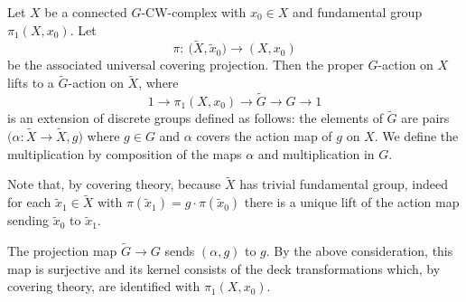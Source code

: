 \documentclass[pdftex]{sigma}
\numberwithin{equation}{section}
\begin{document}
Let $X$ be a connected $G$-CW-complex with $x_0\in X$ and fundamental group
	$\pi_1(X,x_0)$. Let
	\begin{equation*}
		\pi\colon\ \bigl(\tilde{X},\tilde x_0\bigr)\to (X,x_0)
	\end{equation*}
	be the
	associated universal covering projection. Then the
	proper $G$-action on $X$ lifts to a $\widetilde{G}$-action on $\tilde{X}$,
	where
	\begin{equation*}
		1\to\pi_1(X,x_0)\to \widetilde{G}\to G\to 1
	\end{equation*}
	is an extension of
	discrete groups
	defined as follows: the elements of $\widetilde{G}$ are pairs
	$\bigl(\alpha\colon\tilde X\to\tilde X,g\bigr)$ where $g\in G$ and $\alpha$ covers the
	action map of $g$ on $X$. We define the multiplication by composition of the
	maps $\alpha$ and
	multiplication in $G$.
	
	Note that, by covering theory, because $\tilde X$
	has trivial fundamental group, indeed for each $\tilde x_1\in\tilde X$ with
	$\pi(\tilde x_1)=g\cdot \pi(\tilde x_0)$
	there is a unique lift of the action map sending $\tilde x_0$ to $\tilde
	x_1$.
	
	The projection map $\widetilde{G}\to G$ sends $(\alpha,g)$ to $g$. By
	the above consideration, this map is surjective and its kernel consists of
	the deck transformations which, by covering theory, are identified with
	$\pi_1(X,x_0)$.
	
\end{document}
